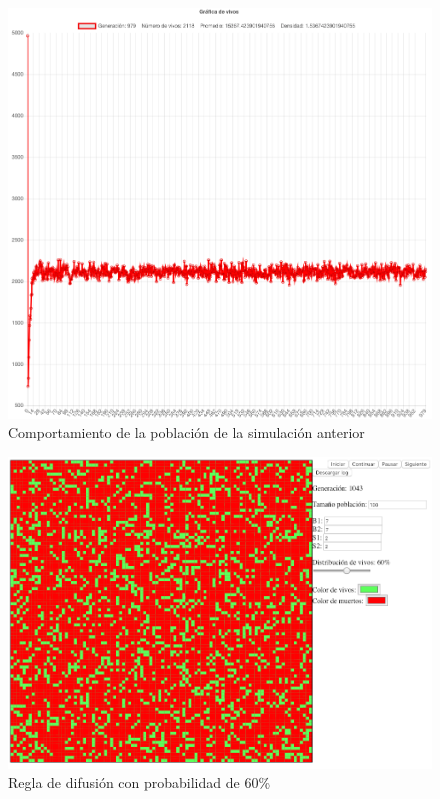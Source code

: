 	\begin{figure}[H]
		\begin{center}
			\includegraphics[scale=.24]{GOL/img/dif50-2.png}
			\caption{Comportamiento de la población de la simulación anterior}
			\label{fig:gol5}
		\end{center}
	\end{figure}

	\begin{figure}[H]
		\begin{center}
			\includegraphics[scale=.3]{GOL/img/dif60-1.png}
			\caption{Regla de difusión con probabilidad de 60\%}
			\label{fig:gol5}
		\end{center}
	\end{figure}

